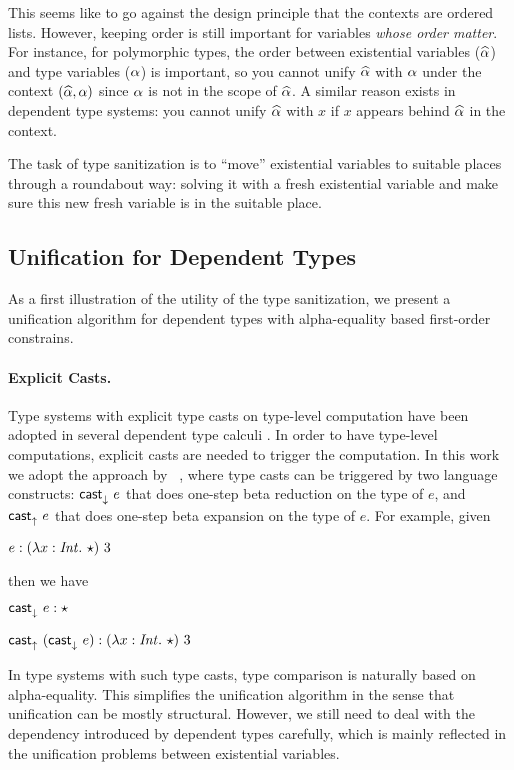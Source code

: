This seems like to go against the design principle that the
contexts are ordered lists. However, keeping order is still important for
variables \textit{whose order matter}. For instance, for polymorphic types, the
order between existential variables ($\widehat{\alpha}$) and type variables ($\alpha$) is
important, so you cannot unify $\widehat{\alpha}$ with $\alpha$ under the context $(\widehat{\alpha},
\alpha)$ since $\alpha$ is not in the scope of $\widehat{\alpha}$. A similar reason exists in
dependent type systems: you cannot unify $\widehat{\alpha}$ with $x$ if $x$ appears behind
$\widehat{\alpha}$ in the context.

The task of type sanitization is to ``move'' existential variables to suitable
places through a roundabout way: solving it with a fresh existential variable
and make sure this new fresh variable is in the suitable place.

\subsection{Unification for Dependent Types}

As a first illustration of the utility of the type sanitization, we present a
unification algorithm for dependent types with alpha-equality based
first-order constrains.

\paragraph{Explicit Casts.}

Type systems with explicit type casts on type-level computation have been
adopted in several dependent type calculi \citep{van2013explicit,
  kimmell2012equational, sjoberg2012irrelevance, sjoberg2015programming,
  stump2009verified, sulzmann2007system, yang2016unified}. In order to have
type-level computations, explicit casts are needed to trigger the computation.
In this work we adopt the approach by ~\citet{yang2016unified}, where type casts
can be triggered by two language constructs: $\mathsf{cast}_\downarrow^{}~ e$ that does one-step beta
reduction on the type of $e$, and $\mathsf{cast}_\uparrow^{}~ e$ that does one-step beta expansion
on the type of $e$. For example, given

$e: (\lambda x:\mathit{Int}.~ \star) ~ 3$

\noindent then we have

$\mathsf{cast}_\downarrow^{}~ e : \star$

$\mathsf{cast}_\uparrow^{}~ (\mathsf{cast}_\downarrow^{}~ e) : (\lambda x:\mathit{Int}.~ \star) ~ 3$

In type systems with such type casts, type comparison is naturally based on alpha-equality. This
simplifies the unification algorithm in the sense that unification can be mostly
structural. However, we still need to deal with the dependency introduced by
dependent types carefully, which is mainly reflected in the unification problems
between existential variables.

